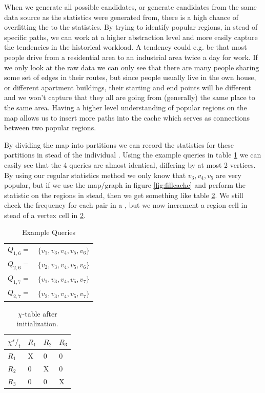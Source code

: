 

When we generate all possible \spath candidates, or generate \spath candidates from the same data source as the statistics were generated from, there is a high chance of overfitting the \spaths to the statistics. By trying to identify popular regions, in stead of specific paths, we can work at a higher abstraction level and more easily capture the tendencies in the historical workload. A tendency could e.g. be that most people drive from a residential area to an industrial area twice a day for work. If we only look at the raw data we can only see that there are many people sharing some set of edges in their routes, but since people usually live in the own house, or different apartment buildings, their starting and end points will be different and we won't capture that they all are going from (generally) the same place to the same area. Having a higher level understanding of popular regions on the map allows us to insert more paths into the cache which serves as connections between two popular regions.

By dividing the map into partitions we can record the statistics for these partitions in stead of the individual \spathsns. Using the example queries in table \ref{tab:queries2} we can easily see that the 4 queries are almost identical, differing by at most 2 vertices. By using our regular statistics method we only know that $v_3,v_4,v_5$ are very popular, but if we use the map/graph in figure \ref{fig:fillcache} and perform the statistic on the regions in stead, then we get something like table \ref{tab:rchitable}. We still check the frequency for each pair in a \spathns, but we now increment a region cell in stead of a vertex cell in \ref{tab:rchitable}.


\begin{table}
\center
\begin{tabular}{l l}
$Q_{1,6} =$ 	& $\{v_1,v_3,v_4,v_5,v_6\}$\\
$Q_{2,6} =$ 	& $\{v_2,v_3,v_4,v_5,v_6\}$ \\
$Q_{1,7} =$ 	& $\{v_1,v_3,v_4,v_5,v_7\}$ \\
$Q_{2,7} =$ 	& $\{v_2,v_3,v_4,v_5,v_7\}$ \\
\end{tabular}
\caption{Example Queries}
\label{tab:queries2}
\end{table}

\begin{table}
\center
\begin{tabular}{|l||l|l|l|}
\textbf{$\chi {^s/_t}$}	& $R_1$		& $R_2$		& $R_3$	\\\hline
$R_1$			& X		& 0		& 0	 \\
$R_2$			& 0		& X		& 0	 \\
$R_3$			& 0		& 0		& X	 \\
\end{tabular}
\caption{$\chi$-table after initialization.}
\label{tab:rchitable}
\end{table}

